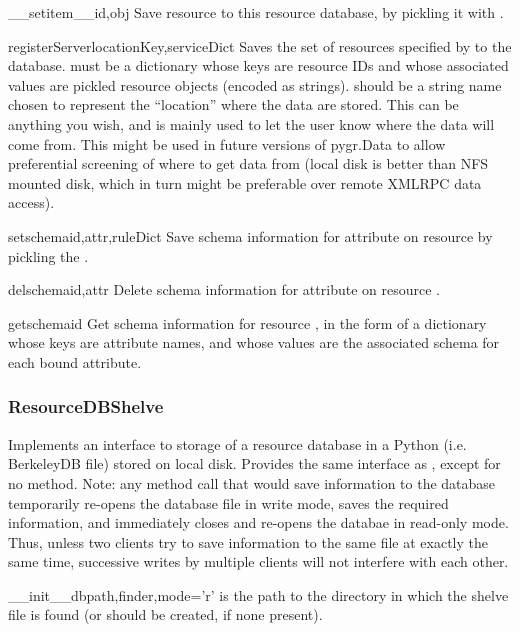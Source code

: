 \documentclass{howto}
\begin{document}
\begin{funcdesc}{__setitem__}{id,obj}
  Save resource  to this resource database, by pickling it
  with .
\end{funcdesc}

\begin{funcdesc}{registerServer}{locationKey,serviceDict}
  Saves the set of resources specified by  to the
  database.
   must be a dictionary whose keys are resource IDs and
  whose associated values are pickled resource objects (encoded as strings).
   should be a string name chosen to represent the ``location''
  where the data are stored.  This can be anything you wish, and is mainly used
  to let the user know where the data will come from.  This might be used
  in future versions of pygr.Data to allow preferential screening of where
  to get data from (local disk is better than NFS mounted disk, which in turn
  might be preferable over remote XMLRPC data access).
\end{funcdesc}

\begin{funcdesc}{setschema}{id,attr,ruleDict}
  Save schema information for attribute  on resource 
  by pickling the .
\end{funcdesc}

\begin{funcdesc}{delschema}{id,attr}
  Delete schema information for attribute  on resource .
\end{funcdesc}

\begin{funcdesc}{getschema}{id}
  Get schema information for resource , in the form of a dictionary
  whose keys are attribute names, and whose values are the associated
  schema  for each bound attribute.
\end{funcdesc}

\subsubsection{ResourceDBShelve}
Implements an interface to storage of a resource database in a Python
 (i.e. BerkeleyDB file) stored on local disk.
Provides the same interface as , except for
no  method.  Note: any method call that would
save information to the database temporarily re-opens the database
file in write mode, saves the required information, and immediately
closes and re-opens
the databae in read-only mode.  Thus, unless two clients try
to save information to the same file at exactly the same time,
successive writes by multiple clients will not interfere with each
other.
\begin{funcdesc}{__init__}{dbpath,finder,mode='r'}
   is the path to the directory in which the shelve
  file is found (or should be created, if none present).
\end{funcdesc}
\end{document}
